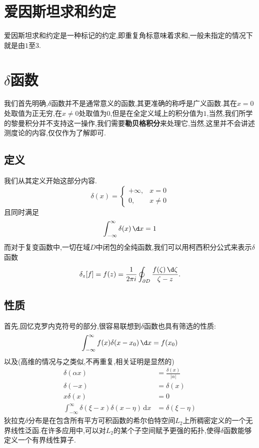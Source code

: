 \section{爱因斯坦求和约定}
爱因斯坦求和约定是一种标记的约定,即重复角标意味着求和,一般未指定的情况下就是由$1$至$3$.
\section{$\delta$函数}
我们首先明确,$\delta$函数并不是通常意义的函数,其更准确的称呼是广义函数.其在$x=0$处取值为正无穷,在$x\ne0$处取值为$0$,但是在全定义域上的积分值为$1$,当然,我们所学的黎曼积分并不支持这一操作,我们需要\textbf{勒贝格积分}来处理它,当然,这里并不会讲述测度论的内容,仅仅作为了解即可.
\subsection{定义}
我们从其定义开始这部分内容.
\begin{equation}
	\delta (x)={\begin{cases}+\infty ,&x=0\\0,&x\neq 0\end{cases}}
\end{equation}
且同时满足
\begin{equation}
	\int _{-\infty }^{\infty }\delta (x)\,\d x=1
\end{equation}
而对于复变函数中,一切在域$D$中闭包的全纯函数,我们可以用柯西积分公式来表示$\delta$函数
\begin{equation}
	\delta _{z}[f]=f(z)={\frac {1}{2\pi i}}\oint _{\partial D}{\frac {f(\zeta )\,\d\zeta }{\zeta -z}}.
\end{equation}
\subsection{性质}
首先,回忆克罗内克符号的部分,很容易联想到$\delta$函数也具有筛选的性质:
\begin{equation}
	\int _{-\infty }^{\infty }f(x)\delta (x-x_{0})\,\d x=f(x_{0})
\end{equation}
以及(高维的情况与之类似,不再重复,相关证明是显然的)
\begin{equation}
	\begin{aligned}
		\delta (\alpha x)&={\frac {\delta (x)}{|\alpha |}}\\
		\delta (-x)&=\delta (x)\\
		x\delta (x)&=0\\
		\int _{-\infty }^{\infty }\delta (\xi -x)\delta (x-\eta )\,\mathrm {d} x&=\delta (\xi -\eta )
	\end{aligned}
\end{equation}
狄拉克$\delta$分布是在包含所有平方可积函数的希尔伯特空间$L_2$上所稠密定义的一个无界线性泛函.在许多应用中,可以对$L_2$的某个子空间赋予更强的拓扑,使得$\delta$函数能够定义一个有界线性算子.
